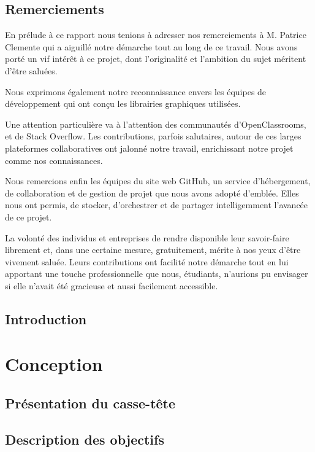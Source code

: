 \documentclass[a4paper,10pt]{report}
\begin{document}
\chapter*{Remerciements}
En prélude à ce rapport nous tenions à adresser nos remerciements à M. Patrice Clemente qui a aiguillé notre démarche tout au long de ce travail. Nous avons porté un vif intérêt à ce projet, dont l’originalité et l’ambition du sujet méritent d’être saluées.\newline

Nous exprimons également notre reconnaissance envers les équipes de développement qui ont conçu les librairies graphiques utilisées.\newline

Une attention particulière va à l’attention des communautés d’OpenClassrooms, et de Stack Overflow. Les contributions, parfois salutaires, autour de ces larges plateformes collaboratives ont jalonné notre travail, enrichissant notre projet comme nos connaissances.\newline

Nous remercions enfin les équipes du site web GitHub, un service d’hébergement, de collaboration et de gestion de projet que nous avons adopté d’emblée. Elles nous ont permis, de stocker, d’orchestrer et de partager intelligemment l’avancée de ce projet.\newline

La volonté des individus et entreprises de rendre disponible leur savoir-faire librement et, dans une certaine mesure, gratuitement, mérite à nos yeux d’être vivement saluée. Leurs contributions ont facilité notre démarche tout en lui apportant une touche professionnelle que nous, étudiants, n’aurions pu envisager si elle n’avait été gracieuse et aussi facilement accessible.

\chapter*{Introduction}


\tableofcontents

\part{Conception}
\chapter{Présentation du casse-tête}

\chapter{Description des objectifs}

\end{document}
